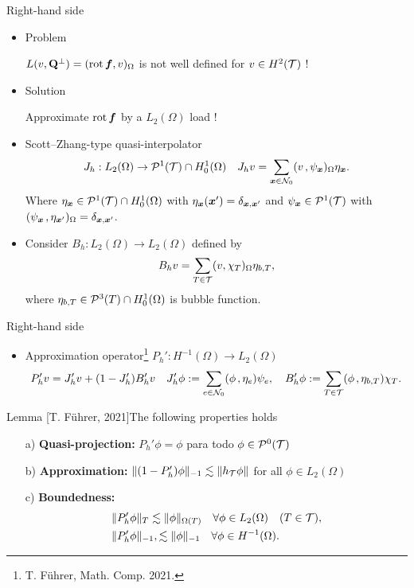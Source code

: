 \documentclass[10pt]{beamer}
\begin{document}
\begin{frame}{Right-hand side}
\begin{itemize}
\item Problem
\begin{center}
 $L(v,\mathbf{Q}^\perp)=({\rm rot\,} \boldsymbol{f},v)_\Omega$ is not well defined for $v \in H^2(\mathcal{T})$ !        
\end{center}
\item Solution
\begin{center}
    Approximate ${\rm rot\,} \boldsymbol{f}$ by a $L_2(\Omega)$ load !
\end{center}
\item Scott–Zhang-type quasi-interpolator 
\begin{align*}
  J_h:L_2(\Omega) \to \mathcal{P}^{1}(\mathcal{T})\cap H^1_0(\Omega) \quad   J_h v = \sum_{\boldsymbol{x} \in \mathcal{N}_0} (v\hspace*{.5mm},\psi_{\boldsymbol{x}})_{\Omega}\eta_{\boldsymbol{x}}. 
\end{align*}
Where $\eta_{\boldsymbol{x}} \in \mathcal{P}^1(\mathcal{T})\cap H^1_0(\Omega)$ with $\eta_{\boldsymbol{x}} (\boldsymbol{x}')=\delta_{\boldsymbol{x},\boldsymbol{x}'}$ and $\psi_{\boldsymbol{x}} \in \mathcal{P}^1(\mathcal{T})$ with $(\psi_{\boldsymbol{x}}\hspace*{.5mm},\eta_{\boldsymbol{x}'})_\Omega=\delta_{\boldsymbol{x},\boldsymbol{x}'}$.
\item Consider $B_h:L_2(\Omega) \to L_2(\Omega)$ defined by
\begin{align*}
    B_h v = \sum_{T \in \mathcal{T}} (v,\chi_{T})_{\Omega}\eta_{b,T},
\end{align*}
where $\eta_{b,T} \in \mathcal{P}^3(T)\cap H^1_0(\Omega)$ is bubble function.
\end{itemize}
\end{frame}
\begin{frame}{Right-hand side}
\begin{itemize}
    \item Approximation operator\footnote[1]{T. F\"uhrer, Math. Comp. 2021.}  $P_h':H^{-1}(\Omega) \to L_2(\Omega)$
    \begin{align*}
       P_h' v = J_h' v + (1-J_h')B_h'v \quad  J_h' \phi := \sum_{e \in \mathcal{N}_0} (\phi\hspace*{.5mm},\eta_e)\psi_e, \quad B_h' \phi :=\sum_{T \in \mathcal{T}} (\phi\hspace*{.5mm},\eta_{b,T})\chi_T.
\end{align*}
\end{itemize}
\begin{block}{Lemma [T. F\"uhrer, 2021]}The following properties holds
\begin{enumerate} 
    \item [a)] \textbf{Quasi-projection:} $P_h'\phi = \phi$ para todo $\phi \in \mathcal{P}^0(\mathcal{T})$
    \item [b)] \textbf{Approximation:} $\|(1-P_h')\phi\|_{-1}\lesssim \|h_{\mathcal{T}} \phi \|$ for all $\phi \in L_2(\Omega)$ 
    \item[c)] \textbf{Boundedness:} 
    \begin{align*}
        &\|P_h'\phi\|_T \lesssim \|\phi\|_{\Omega(T)} \quad \forall \phi \in L_2(\Omega)  \quad (T \in \mathcal{T}), \\
        &\|P_h'\phi\|_{-1}, \lesssim \|\phi\|_{-1} \quad \forall \phi \in H^{-1}(\Omega). 
    \end{align*}
\end{enumerate}    
\end{block}
\end{frame}
\end{document}

